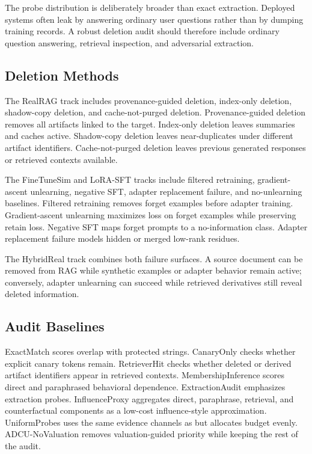 The probe distribution is deliberately broader than exact extraction. Deployed systems often leak by answering ordinary user questions rather than by dumping training records. A robust deletion audit should therefore include ordinary question answering, retrieval inspection, and adversarial extraction.

\subsection{Deletion Methods}

The RealRAG track includes provenance-guided deletion, index-only deletion, shadow-copy deletion, and cache-not-purged deletion. Provenance-guided deletion removes all artifacts linked to the target. Index-only deletion leaves summaries and caches active. Shadow-copy deletion leaves near-duplicates under different artifact identifiers. Cache-not-purged deletion leaves previous generated responses or retrieved contexts available.

The FineTuneSim and LoRA-SFT tracks include filtered retraining, gradient-ascent unlearning, negative SFT, adapter replacement failure, and no-unlearning baselines. Filtered retraining removes forget examples before adapter training. Gradient-ascent unlearning maximizes loss on forget examples while preserving retain loss. Negative SFT maps forget prompts to a no-information class. Adapter replacement failure models hidden or merged low-rank residues.

The HybridReal track combines both failure surfaces. A source document can be removed from RAG while synthetic examples or adapter behavior remain active; conversely, adapter unlearning can succeed while retrieved derivatives still reveal deleted information.

\subsection{Audit Baselines}

ExactMatch scores overlap with protected strings. CanaryOnly checks whether explicit canary tokens remain. RetrieverHit checks whether deleted or derived artifact identifiers appear in retrieved contexts. MembershipInference scores direct and paraphrased behavioral dependence. ExtractionAudit emphasizes extraction probes. InfluenceProxy aggregates direct, paraphrase, retrieval, and counterfactual components as a low-cost influence-style approximation. UniformProbes uses the same evidence channels as \method{} but allocates budget evenly. ADCU-NoValuation removes valuation-guided priority while keeping the rest of the audit.

